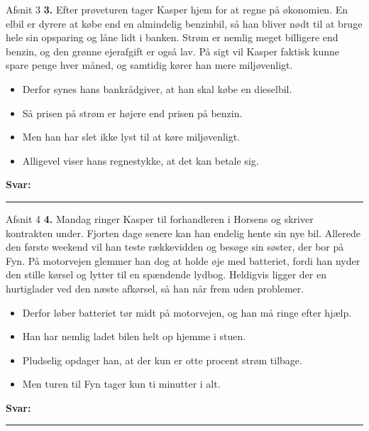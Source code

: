\begin{emailbox}{Afsnit 3}
\textbf{3.} Efter prøveturen tager Kasper hjem for at regne på økonomien. En elbil er dyrere at købe end en almindelig benzinbil, så han bliver nødt til at bruge hele sin opsparing og låne lidt i banken. \underline{\hspace{2.8cm}} Strøm er nemlig meget billigere end benzin, og den grønne ejerafgift er også lav. På sigt vil Kasper faktisk kunne spare penge hver måned, og samtidig kører han mere miljøvenligt.
\vspace{0.35em}
\begin{itemize}[leftmargin=1.6em, itemsep=0.15em]
  \item[\textbf{A.}] Derfor synes hans bankrådgiver, at han skal købe en dieselbil.
  \item[\textbf{B.}] Så prisen på strøm er højere end prisen på benzin.
  \item[\textbf{C.}] Men han har slet ikke lyst til at køre miljøvenligt.
  \item[\textbf{D.}] Alligevel viser hans regnestykke, at det kan betale sig.
\end{itemize}
\hfill \textbf{Svar:} \rule{1.2cm}{0.4pt}
\end{emailbox}

\begin{emailbox}{Afsnit 4}
\textbf{4.} Mandag ringer Kasper til forhandleren i Horsens og skriver kontrakten under. Fjorten dage senere kan han endelig hente sin nye bil. Allerede den første weekend vil han teste rækkevidden og besøge sin søster, der bor på Fyn. På motorvejen glemmer han dog at holde øje med batteriet, fordi han nyder den stille kørsel og lytter til en spændende lydbog. \underline{\hspace{2.8cm}} Heldigvis ligger der en hurtiglader ved den næste afkørsel, så han når frem uden problemer.
\vspace{0.35em}
\begin{itemize}[leftmargin=1.6em, itemsep=0.15em]
  \item[\textbf{A.}] Derfor løber batteriet tør midt på motorvejen, og han må ringe efter hjælp.
  \item[\textbf{B.}] Han har nemlig ladet bilen helt op hjemme i stuen.
  \item[\textbf{C.}] Pludselig opdager han, at der kun er otte procent strøm tilbage.
  \item[\textbf{D.}] Men turen til Fyn tager kun ti minutter i alt.
\end{itemize}
\hfill \textbf{Svar:} \rule{1.2cm}{0.4pt}
\end{emailbox}

